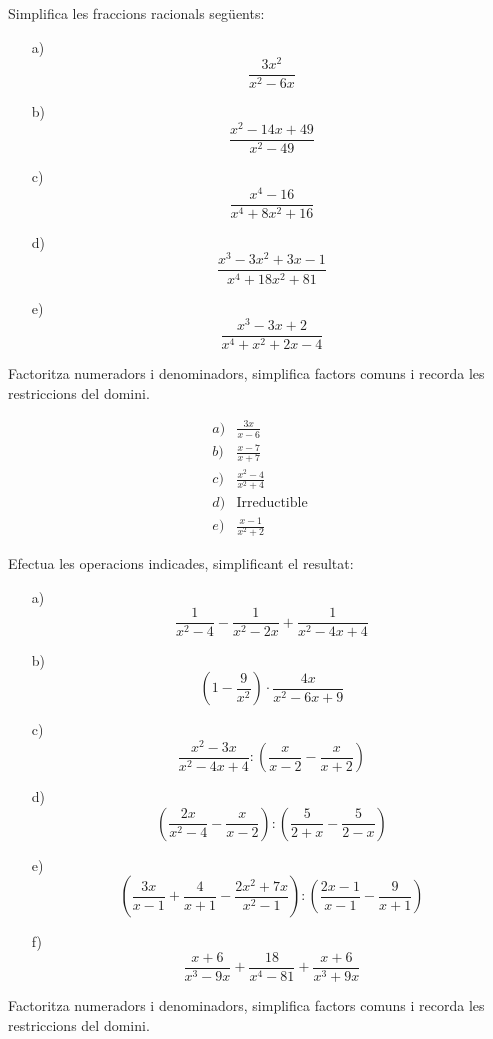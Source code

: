 \begin{exercici}
Simplifica les fraccions racionals següents:

\begin{enumerate}
\item[a)]
\[
\frac{3x^{2}}{x^{2}-6x}
\]

\item[b)]
\[
\frac{x^{2}-14x+49}{x^{2}-49}
\]

\item[c)]
\[
\frac{x^{4}-16}{x^{4}+8x^{2}+16}
\]

\item[d)]
\[
\frac{x^{3}-3x^{2}+3x-1}{x^{4}+18x^{2}+81}
\]

\item[e)]
\[
\frac{x^{3}-3x+2}{x^{4}+x^{2}+2x-4}
\]
\end{enumerate}
\end{exercici}
\begin{indicacio}
Factoritza numeradors i denominadors, simplifica factors comuns i recorda les restriccions del domini.
\end{indicacio}

\begin{solucio}
\[
\begin{array}{ll}
a) & \frac{3x}{x-6} \\
b) & \frac{x-7}{x+7} \\
c) & \frac{x^{2}-4}{x^{2}+4} \\
d) & \text{Irreductible} \\
e) & \frac{x-1}{x^{2}+2}
\end{array}
\]
\end{solucio}

\begin{exercici}
Efectua les operacions indicades, simplificant el resultat:

\begin{enumerate}
\item[a)]
\[
\frac{1}{x^{2}-4}-\frac{1}{x^{2}-2x}+\frac{1}{x^{2}-4x+4}
\]

\item[b)]
\[
\left( 1-\frac{9}{x^{2}}\right) \cdot \frac{4x}{x^{2}-6x+9}
\]

\item[c)]
\[
\frac{x^{2}-3x}{x^{2}-4x+4}:\left( \frac{x}{x-2}-\frac{x}{x+2}\right)
\]

\item[d)]
\[
\left( \frac{2x}{x^{2}-4}-\frac{x}{x-2}\right):\left( \frac{5}{2+x}-\frac{5
}{2-x}\right)
\]

\item[e)]
\[
\left( \frac{3x}{x-1}+\frac{4}{x+1}-\frac{2x^{2}+7x}{x^{2}-1}\right):\left(
\frac{2x-1}{x-1}-\frac{9}{x+1}\right)
\]

\item[f)]
\[
\frac{x+6}{x^{3}-9x}+\frac{18}{x^{4}-81}+\frac{x+6}{x^{3}+9x}
\]
\end{enumerate}
\end{exercici}
\begin{indicacio}
Factoritza numeradors i denominadors, simplifica factors comuns i recorda les restriccions del domini.
\end{indicacio}


